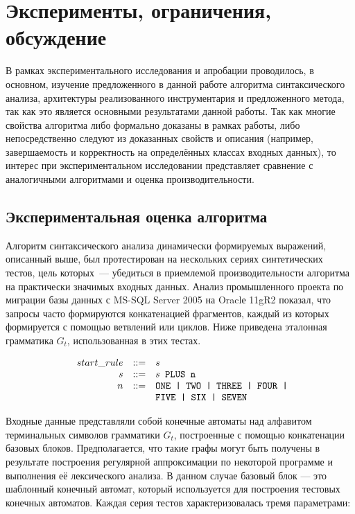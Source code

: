 \chapter{Эксперименты, ограничения, обсуждение} \label{chaptEval}

В рамках экспериментального исследования и апробации проводилось, в основном, изучение предложенного в данной работе алгоритма синтаксического анализа, архитектуры реализованного инструментария и предложенного метода, так как это является основными результатами данной работы. Так как многие свойства алгоритма либо формально доказаны в рамках работы, либо непосредственно следуют из доказанных свойств и описания (например, завершаемость и корректность на определённых классах входных данных), то интерес при экспериментальном исследовании представляет сравнение с аналогичными алгоритмами и оценка производительности.


\section{Экспериментальная оценка алгоритма}\label{SyntTestsEvalDescr}

Алгоритм синтаксического анализа динамически формируемых выражений, описанный выше, был протестирован на нескольких сериях синтетических тестов, цель которых~--- убедиться в приемлемой производительности алгоритма на практически значимых входных данных. Анализ промышленного проекта по миграции базы данных с MS-SQL Server 2005 на Oraclе 11gR2 показал, что запросы часто формируются конкатенацией фрагментов, каждый из которых формируется с помощью ветвлений или циклов. Ниже приведена эталонная грамматика $G_t$, использованная в этих тестах.

$$
\begin{array}{crcl}
& start\_rule &::=& s \\
& s & ::= & s \mbox{\texttt{ PLUS }} \mbox{\texttt{n}}\\
& n & ::= & \mbox{\texttt{ONE | }} \mbox{\texttt{TWO | }} \mbox{\texttt{THREE | }} \mbox{\texttt{FOUR | }} \\
&   &     & \mbox{\texttt{FIVE | }} \mbox{\texttt{SIX | }} \mbox{\texttt{SEVEN}}
\end{array}
$$

Входные данные представляли собой конечные автоматы над алфавитом терминальных символов грамматики $G_t$, построенные с помощью конкатенации базовых блоков. Предполагается, что такие графы могут быть получены в результате построения регулярной аппроксимации по некоторой программе и выполнения её лексического анализа. В данном случае базовый блок --- это шаблонный конечный автомат, который используется для построения тестовых конечных автоматов. Каждая серия тестов характеризовалась тремя параметрами: 

